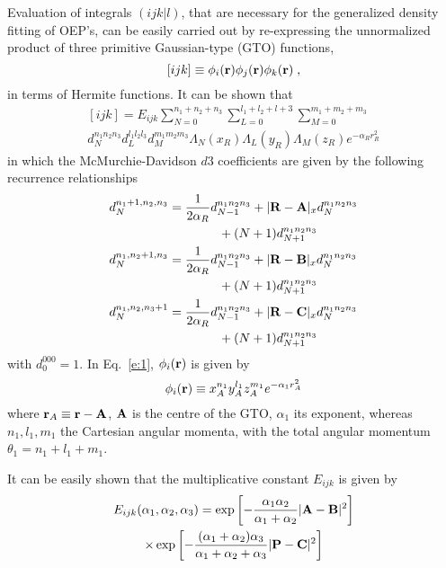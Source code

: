 Evaluation of integrals $(ijk\vert l)$,
that are necessary for the generalized density fitting of OEP's,
can be easily carried out by re\hyp{}expressing the
unnormalized product of three primitive Gaussian\hyp{}type (GTO) functions,
%
\begin{equation} \label{e:1}
[ijk] \equiv \phi_i({\bf r}) \phi_j({\bf r}) \phi_k({\bf r}) \;,
\end{equation}
%
in terms of Hermite functions. It can be shown that
%
\begin{multline} \label{e:2}
   [ijk] = E_{ijk} \sum_{N=0}^{n_1+n_2+n_3} \sum_{L=0}^{l_1+l_2+l+3} \sum_{M=0}^{m_1+m_2+m_3} 
	\\
          d_N^{n_1n_2n_3} d_L^{l_1l_2l_3} d_M^{m_1m_2m_3}
          \Lambda_N(x_R)\Lambda_L(y_R)\Lambda_M(z_R)e^{-\alpha_Rr_R^2}
\end{multline}
%
in which the McMurchie-Davidson $d3$ coefficients are given by the following recurrence relationships
%
 \begin{align} \label{e:3}
  d_N^{n_1+1,n_2,n_3} &= \frac{1}{2\alpha_R} d_{N-1}^{n_1n_2n_3} 
                             + \vert {\bf R} - {\bf A}\vert_x d_N^{n_1n_2n_3} \nonumber \\ 
			    & \qquad\qquad + (N+1) d_{N+1}^{n_1n_2n_3} \\
  d_N^{n_1,n_2+1,n_3} &= \frac{1}{2\alpha_R} d_{N-1}^{n_1n_2n_3} 
                             + \vert {\bf R} - {\bf B}\vert_x d_N^{n_1n_2n_3} \nonumber \\
			    & \qquad\qquad + (N+1) d_{N+1}^{n_1n_2n_3} \\
  d_N^{n_1,n_2,n_3+1} &= \frac{1}{2\alpha_R} d_{N-1}^{n_1n_2n_3} 
                             + \vert {\bf R} - {\bf C}\vert_x d_N^{n_1n_2n_3} \nonumber \\
			    & \qquad\qquad + (N+1) d_{N+1}^{n_1n_2n_3} 
\end{align}
%
with $d_0^{000} = 1$.
In Eq.~\eqref{e:1},
$\phi_i({\bf r})$ is given by
%
\begin{equation}
\phi_i({\bf r}) \equiv x_A^{n_1} y_A^{l_1} z_A^{m_1} e^{-\alpha_1r_A^2}
\end{equation}
%
where 
${\bf r}_A \equiv {\bf r} - {\bf A}$,
${\bf A}$ is the centre of the GTO, $\alpha_1$ its exponent, whereas $n_1,l_1,m_1$
the Cartesian angular momenta, with the total angular momentum $\theta_1 = n_1+l_1+m_1$.

It can be easily shown that the multiplicative constant $E_{ijk}$ is given by
%
\begin{multline}
  E_{ijk}(\alpha_1,\alpha_2,\alpha_3)  = \exp{\left[-\frac{\alpha_1\alpha_2}
                                        {\alpha_1+\alpha_2}\vert {\bf A}-{\bf B}\vert^2\right]} \\ \times
                                         \exp{\left[-\frac{(\alpha_1+\alpha_2)\alpha_3}
                                        {\alpha_1+\alpha_2+\alpha_3}
                                         \vert {\bf P}-{\bf C}\vert^2\right]} 
\end{multline}
%




